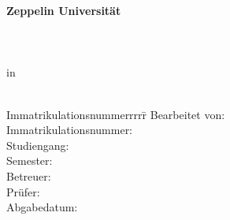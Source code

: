 \begin{centering}
\Large \textbf{Zeppelin Universität}\\
\Large \Chair \\
\vfill
\LARGE \textbf{\Title} \\
\vfill
\LARGE \Degree\\ %
\Large in \\
\LARGE \Programme\\
\vfill
\begin{small}
\begin{doublespace}
	\begin{tabbing}
	Immatrikulationsnummerrrrr\=\kill
	Bearbeitet von:\>\Name\\
	Immatrikulationsnummer:\>\MatrikelNummer\\
	Studiengang:\>\Programme\\
	Semester:\>\Semester\\
	Betreuer:\>\Supervisor\\
	Prüfer:\>\Pruefer\\
	Abgabedatum:\>\Date
	\end{tabbing}
\end{doublespace}
\end{small}

\end{centering}\vspace{1cm}